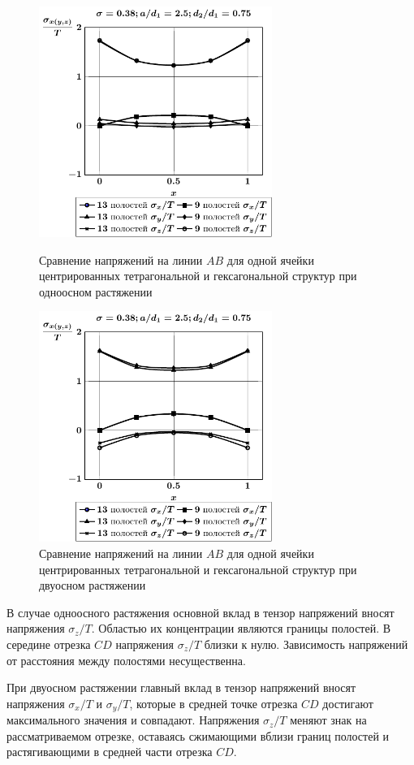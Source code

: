 \begin{figure}[h!]
\centering\footnotesize
\parbox[b]{7.5cm}{\centering\includegraphics[width=7.6cm]{cav13-9-a25-t1.pdf}
\caption{Сравнение напряжений на линии $AB$ для одной ячейки центрированных тетрагональной и гексагональной структур при одноосном растяжении 
\label{f:9:56}}}\hfil\hfil
\parbox[b]{7.5cm}{\centering\includegraphics[width=7.6cm]{cav13-9-a25-t2.pdf}
\caption{Сравнение напряжений на линии $AB$ для одной ячейки центрированных тетрагональной и гексагональной структур при двуосном растяжении
\label{f:9:57}}}
\end{figure}

В случае одноосного растяжения основной вклад в тензор напряжений вносят напряжения $\sigma_z/T$. Областью их концентрации являются границы полостей. В середине отрезка $CD$ напряжения $\sigma_z/T$ близки к нулю. Зависимость напряжений от расстояния между полостями несущественна.

При двуосном растяжении главный вклад в тензор напряжений вносят напряжения $\sigma_x/T$ и $\sigma_y/T$, которые в средней точке отрезка $CD$ достигают максимального значения и совпадают. Напряжения $\sigma_z/T$ меняют знак на рассматриваемом отрезке, оставаясь сжимающими вблизи границ полостей и растягивающими в средней части отрезка $CD$.

